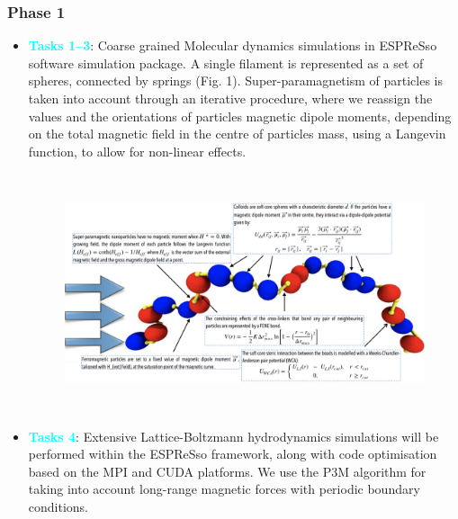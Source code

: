 \documentclass{article}
\begin{document}
\subsubsection{Phase 1}
\begin{itemize}
    \item{\textbf{\textcolor{cyan}{Tasks 1–3}}: Coarse grained Molecular dynamics simulations in ESPReSso software simulation package.\cite{limbach2006espresso} A single filament is represented as a set of spheres, connected by springs (Fig. 1). Super-paramagnetism of particles is taken into account through an iterative procedure, where we reassign the values and the orientations of particles magnetic dipole moments, depending on the total magnetic field in the centre of particles mass, using a Langevin function, to allow for non-linear effects.}
\begin{figure}[h!]
\centering
  \includegraphics[height=7cm]{fig2}
\end{figure}
    \item{\textbf{\textcolor{cyan}{Tasks 4}}: Extensive Lattice-Boltzmann hydrodynamics simulations will be performed within the ESPReSso framework, along with code optimisation based on the MPI and CUDA platforms. We use the P3M algorithm for taking into account long-range magnetic forces with periodic boundary conditions.\cite{cerda2008p}}

\end{itemize}
\end{document}
